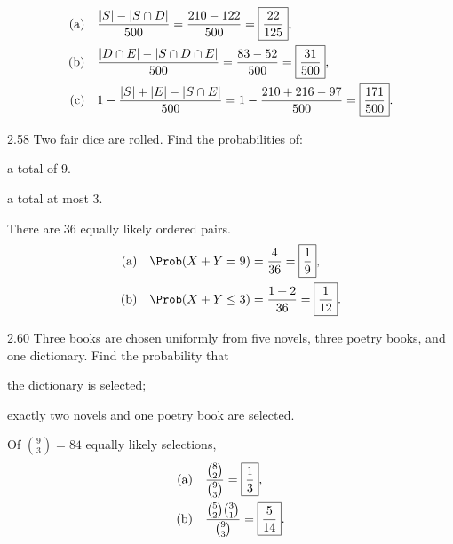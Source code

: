 \documentclass[11pt,oneside]{article}
\begin{document}
\begin{solution}
\begin{align*}
\textup{(a)}\quad&\frac{|S|-|S\cap D|}{500}=\frac{210-122}{500}=\boxed{\frac{22}{125}},\\
\textup{(b)}\quad&\frac{|D\cap E|-|S\cap D\cap E|}{500}=\frac{83-52}{500}=\boxed{\frac{31}{500}},\\
\textup{(c)}\quad&1-\frac{|S|+|E|-|S\cap E|}{500}
=1-\frac{210+216-97}{500}=\boxed{\frac{171}{500}}.
\end{align*}
\end{solution}

\begin{exercise}{2.58}
Two fair dice are rolled. Find the probabilities of:
\begin{exercisesubparts}
\item a total of 9.
\item a total at most 3.
\end{exercisesubparts}
\end{exercise}

\begin{solution}
There are 36 equally likely ordered pairs.
\begin{align*}
\textup{(a)}\quad&\Prob(X+Y=9)=\frac4{36}=\boxed{\frac19},\\
\textup{(b)}\quad&\Prob(X+Y\le3)=\frac{1+2}{36}=\boxed{\frac1{12}}.
\end{align*}
\end{solution}

\begin{exercise}{2.60}
Three books are chosen uniformly from five novels, three poetry books, and one dictionary. Find the probability that
\par
\begin{exercisesubparts}
\item the dictionary is selected;
\item exactly two novels and one poetry book are selected.
\end{exercisesubparts}
\end{exercise}

\begin{solution}
Of $\displaystyle \binom{9}{3}=84$ equally likely selections,
\begin{align*}
\textup{(a)}&\quad\frac{\binom{8}{2}}{\binom{9}{3}}=\boxed{\frac13},\\
\textup{(b)}&\quad\frac{\binom{5}{2}\binom{3}{1}}{\binom{9}{3}}=\boxed{\frac5{14}}.
\end{align*}
\end{solution}
\end{document}
